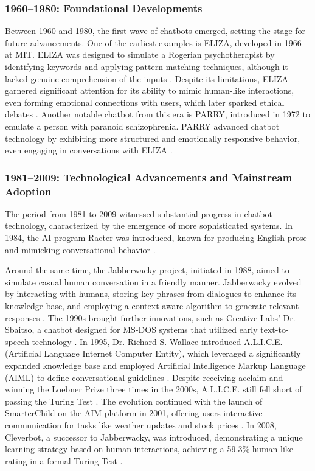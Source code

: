 \subsubsection{1960–1980: Foundational Developments}

Between 1960 and 1980, the first wave of chatbots emerged, setting the stage for future advancements. One of the earliest examples is ELIZA, developed in 1966 at MIT. ELIZA was designed to simulate a Rogerian psychotherapist by identifying keywords and applying pattern matching techniques, although it lacked genuine comprehension of the inputs \cite{weizenbaum1966eliza}. Despite its limitations, ELIZA garnered significant attention for its ability to mimic human-like interactions, even forming emotional connections with users, which later sparked ethical debates \cite{zimmerman2023human}. Another notable chatbot from this era is PARRY, introduced in 1972 to emulate a person with paranoid schizophrenia. PARRY advanced chatbot technology by exhibiting more structured and emotionally responsive behavior, even engaging in conversations with ELIZA \cite{colby1971artificial}.

\subsubsection{1981–2009: Technological Advancements and Mainstream Adoption}

The period from 1981 to 2009 witnessed substantial progress in chatbot technology, characterized by the emergence of more sophisticated systems. In 1984, the AI program Racter was introduced, known for producing English prose and mimicking conversational behavior \cite{wikipedia2023racter}. 

Around the same time, the Jabberwacky project, initiated in 1988, aimed to simulate casual human conversation in a friendly manner. Jabberwacky evolved by interacting with humans, storing key phrases from dialogues to enhance its knowledge base, and employing a context-aware algorithm to generate relevant responses \cite{shawar2007fostering}. The 1990s brought further innovations, such as Creative Labs' Dr. Sbaitso, a chatbot designed for MS-DOS systems that utilized early text-to-speech technology \cite{deryugina2010chatterbots}. In 1995, Dr. Richard S. Wallace introduced A.L.I.C.E. (Artificial Language Internet Computer Entity), which leveraged a significantly expanded knowledge base and employed Artificial Intelligence Markup Language (AIML) to define conversational guidelines \cite{wallace2009anatomy}. Despite receiving acclaim and winning the Loebner Prize three times in the 2000s, A.L.I.C.E. still fell short of passing the Turing Test \cite{shum2018eliza}. The evolution continued with the launch of SmarterChild on the AIM platform in 2001, offering users interactive communication for tasks like weather updates and stock prices \cite{adamopoulou2020chatbots}. In 2008, Cleverbot, a successor to Jabberwacky, was introduced, demonstrating a unique learning strategy based on human interactions, achieving a 59.3\% human-like rating in a formal Turing Test \cite{wikipedia2023cleverbot}.

